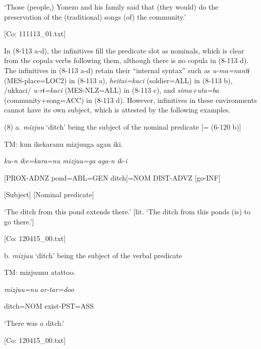       ‘Those (people,) Yonezo and his family said that (they would) do the preservation of the (traditional) songs (of) the community.’

      [Co: 111113\_01.txt]

In (8-113 a-d), the infinitives fill the predicate slot as nominals, which is clear from the copula verbs following them, although there is no copula in (8-113 d). The infinitives in (8-113 a-d) retain their “internal syntax” \citep{Haspelmath1996} such as \textit{u-ma=nantɨ} (MES-place=LOC2) in (8-113 a), \textit{heitai=kaci} (soldier=ALL) in (8-113 b), /ukkaci/ \textit{u-rɨ=kaci} (MES-NLZ=ALL) in (8-113 c), and \textit{sima+uta=ba} (community+song=ACC) in (8-113 d). However, infinitives in these environments cannot have its own subject, which is attested by the following examples.

(8)  a. \textit{mizjuu} ‘ditch’ being the subject of the nominal predicate [= (6-120 b)]

  TM:  kun  {\textbar}ike{\textbar}karanu  mizjuuga  agan  iki.

    \textit{ku-n}  \textit{ike=kara=nu}  \textit{mizjuu=ga}  \textit{aga-n}  \textit{ik-i}

    [PROX-ADNZ  pond=ABL=GEN  ditch]=NOM  DIST-ADVZ  [go-INF]

    [Subject]    [Nominal predicate]

    ‘The ditch from this pond extends there.’ [lit. ‘The ditch from this ponds (is) to go there.’]

    [Co: 120415\_00.txt]

  b. \textit{mizjuu} ‘ditch’ being the subject of the verbal predicate

  TM:  mizjuunu  atattoo.      

    \textit{mizjuu=nu}  \textit{ar-tar=doo}      

    ditch=NOM  exist-PST=ASS      

    ‘There was a ditch.’

    [Co: 120415\_00.txt]

